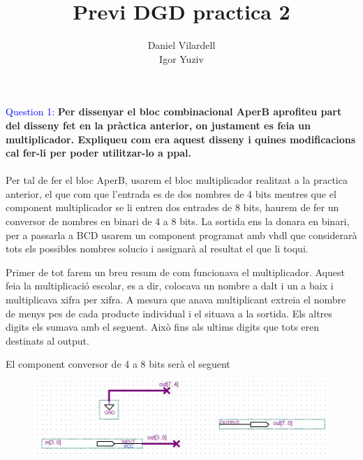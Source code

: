 \documentclass[12pt, a4papre]{article}
\author{Daniel Vilardell\\
	   Igor Yuziv}
\title{Previ DGD practica 2}
\date{}
\begin{document}
	\maketitle
	\newpage
	
	\textcolor{blue}{Question 1:} \textbf{Per dissenyar el bloc combinacional AperB aprofiteu part del disseny fet en la pràctica anterior, on justament es feia un multiplicador. Expliqueu com era aquest disseny i quines modificacions cal fer-li per poder utilitzar-lo a ppal.}\\\\
	
	Per tal de fer el bloc AperB, usarem el bloc multiplicador realitzat a la practica anterior, el que com que l'entrada es de dos nombres de 4 bits mentres que el component multiplicador se li entren dos entrades de 8 bits, haurem de fer un conversor de nombres en binari de 4 a 8 bits. La sortida ens la donara en binari, per a passarla a BCD usarem un component programat amb vhdl que considerarà tots els possibles nombres solucio i assignarà al resultat el que li toqui.
	
	Primer de tot farem un breu resum de com funcionava el multiplicador. Aquest feia la multiplicació escolar, es a dir, colocava un nombre a dalt i un a baix i multiplicava xifra per xifra. A mesura que anava multiplicant extreia el nombre de menys pes de cada producte individual i el situava a la sortida. Els altres digits els sumava amb el seguent. Això fins als ultims digits que tots eren destinats al output.
	
	El component conversor de 4 a 8 bits serà el seguent
	
	\begin{figure}[H]
		\begin{center}
		\includegraphics[width=150mm]{Pregunta1_1.jpeg}
		\end{center}
	\end{figure}
	
\end{document}
